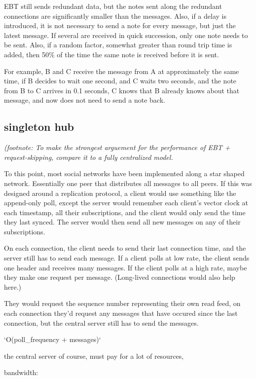 \documentclass[sigconf]{acmart}
\begin{document}
EBT still sends redundant data, but the notes sent along the redundant
connections are significantly smaller than the messages. Also, if a
delay is introduced, it is not necessary to send a note for every
message, but just the latest message.  If several are received in
quick succession, only one note needs to be sent.  Also, if a random
factor, somewhat greater than round trip time is added, then 50\% of
the time the same note is received before it is sent.

For example, B and C receive the message from A at approximately the
same time, if B decides to wait one second, and C waits two seconds,
and the note from B to C arrives in 0.1 seconds, C knows that B
already knows about that message, and now does not need to send a note
back.

\subsection{singleton hub}

{\em (footnote: To make the strongest arguement for the performance of
  EBT + request-skipping, compare it to a fully centralized model.}

To this point, most social networks have been implemented along a star
shaped network. Essentially one peer that distributes all messages to
all peers. If this was designed around a replication protocol, a
client would use something like the append-only poll, except the
server would remember each client's vector clock at each timestamp,
all their subscriptions, and the client would only send the time they
last synced.  The server would then send all new messages on any of
their subscriptions.

On each connection, the client needs to send their last connection
time, and the server still has to send each message. If a client polls
at low rate, the client sends one header and receives many
messages. If the client polls at a high rate, maybe they make one
request per message. (Long-lived connections would also help here.)

They would request the sequence number representing their own read
feed, on each connection they'd request any messages that have occured
since the last connection, but the central server still has to send
the messages.

`O(poll\_frequency + messages)`

the central server of course, must pay for a lot of resources,

bandwidth:
\end{document}
